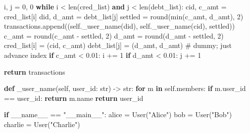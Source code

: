 \documentclass[11pt]{article}
\newenvironment{Shaded}{\begin{snugshade}}{\end{snugshade}}
\newcommand{\BuiltInTok}[1]{\textcolor[rgb]{0.50,0.55,0.55}{#1}}
\newcommand{\CommentTok}[1]{\textcolor[rgb]{0.48,0.49,0.49}{#1}}
\newcommand{\ControlFlowTok}[1]{\textcolor[rgb]{0.99,0.74,0.29}{\textbf{#1}}}
\newcommand{\DecValTok}[1]{\textcolor[rgb]{0.96,0.45,0.00}{#1}}
\newcommand{\FloatTok}[1]{\textcolor[rgb]{0.96,0.45,0.00}{#1}}
\newcommand{\KeywordTok}[1]{\textcolor[rgb]{0.81,0.81,0.76}{\textbf{#1}}}
\newcommand{\NormalTok}[1]{\textcolor[rgb]{0.81,0.81,0.76}{#1}}
\newcommand{\OperatorTok}[1]{\textcolor[rgb]{0.81,0.81,0.76}{#1}}
\newcommand{\StringTok}[1]{\textcolor[rgb]{0.96,0.31,0.31}{#1}}
\newcommand{\VariableTok}[1]{\textcolor[rgb]{0.15,0.68,0.68}{#1}}
\begin{document}
\begin{Shaded}
\begin{Highlighting}[]
\NormalTok{        i, j }\OperatorTok{=} \DecValTok{0}\NormalTok{, }\DecValTok{0}
        \ControlFlowTok{while}\NormalTok{ i }\OperatorTok{\textless{}} \BuiltInTok{len}\NormalTok{(cred\_list) }\KeywordTok{and}\NormalTok{ j }\OperatorTok{\textless{}} \BuiltInTok{len}\NormalTok{(debt\_list):}
\NormalTok{            cid, c\_amt }\OperatorTok{=}\NormalTok{ cred\_list[i]}
\NormalTok{            did, d\_amt }\OperatorTok{=}\NormalTok{ debt\_list[j]}
\NormalTok{            settled }\OperatorTok{=} \BuiltInTok{round}\NormalTok{(}\BuiltInTok{min}\NormalTok{(c\_amt, d\_amt), }\DecValTok{2}\NormalTok{)}
\NormalTok{            transactions.append((}\VariableTok{self}\NormalTok{.\_user\_name(did), }\VariableTok{self}\NormalTok{.\_user\_name(cid), settled))}
\NormalTok{            c\_amt }\OperatorTok{=} \BuiltInTok{round}\NormalTok{(c\_amt }\OperatorTok{{-}}\NormalTok{ settled, }\DecValTok{2}\NormalTok{)}
\NormalTok{            d\_amt }\OperatorTok{=} \BuiltInTok{round}\NormalTok{(d\_amt }\OperatorTok{{-}}\NormalTok{ settled, }\DecValTok{2}\NormalTok{)}
\NormalTok{            cred\_list[i] }\OperatorTok{=}\NormalTok{ (cid, c\_amt)}
\NormalTok{            debt\_list[j] }\OperatorTok{=}\NormalTok{ (d\_amt, d\_amt)  }\CommentTok{\# dummy; just advance index}
            \ControlFlowTok{if}\NormalTok{ c\_amt }\OperatorTok{\textless{}} \FloatTok{0.01}\NormalTok{:}
\NormalTok{                i }\OperatorTok{+=} \DecValTok{1}
            \ControlFlowTok{if}\NormalTok{ d\_amt }\OperatorTok{\textless{}} \FloatTok{0.01}\NormalTok{:}
\NormalTok{                j }\OperatorTok{+=} \DecValTok{1}

        \ControlFlowTok{return}\NormalTok{ transactions}

    \KeywordTok{def}\NormalTok{ \_user\_name(}\VariableTok{self}\NormalTok{, user\_id: }\BuiltInTok{str}\NormalTok{) }\OperatorTok{{-}\textgreater{}} \BuiltInTok{str}\NormalTok{:}
        \ControlFlowTok{for}\NormalTok{ m }\KeywordTok{in} \VariableTok{self}\NormalTok{.members:}
            \ControlFlowTok{if}\NormalTok{ m.user\_id }\OperatorTok{==}\NormalTok{ user\_id:}
                \ControlFlowTok{return}\NormalTok{ m.name}
        \ControlFlowTok{return}\NormalTok{ user\_id}


\ControlFlowTok{if} \VariableTok{\_\_name\_\_} \OperatorTok{==} \StringTok{"\_\_main\_\_"}\NormalTok{:}
\NormalTok{    alice }\OperatorTok{=}\NormalTok{ User(}\StringTok{"Alice"}\NormalTok{)}
\NormalTok{    bob }\OperatorTok{=}\NormalTok{ User(}\StringTok{"Bob"}\NormalTok{)}
\NormalTok{    charlie }\OperatorTok{=}\NormalTok{ User(}\StringTok{"Charlie"}\NormalTok{)}


\end{Highlighting}
\end{Shaded}
\end{document}
